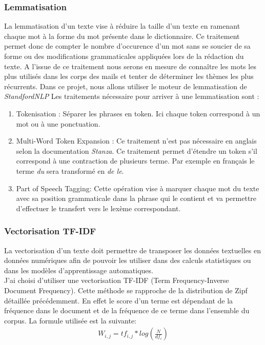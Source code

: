 \documentclass[a4paper,12pt]{article}
\begin{document}
		\subsubsection{Lemmatisation}
			La lemmatisation d'un texte vise à réduire la taille d'un texte en ramenant chaque mot à la forme du mot présente dans le dictionnaire. Ce traitement permet donc de compter le nombre d'occurence d'un mot sans se soucier de sa forme ou des modifications grammaticales appliquées lors de la rédaction du texte. A l'issue de ce traitement nous serons en mesure de connaître les mots les plus utilisés dans les corps des mails et tenter de déterminer les thèmes les plus récurrents.  
			Dans ce projet, nous allons utiliser le moteur de lemmatisation de \emph{StandfordNLP}\cite{manning-EtAl:2014:P14-5}\cite{qi2020stanza}
			Les traitements nécessaire pour arriver à une lemmatisation sont :
			\begin{enumerate}
				\item Tokenisation : Séparer les phrases en token. Ici chaque token correspond à un mot ou à une ponctuation.
				\item Multi-Word Token Expansion : Ce traitement n'est pas nécessaire en anglais selon la documentation \emph{Stanza}. Ce traitement permet d'étendre un token s'il correspond à une contraction de plusieurs terme. Par exemple en français le terme \emph{du} sera transformé en \emph{de le}.
				\item Part of Speech Tagging: Cette opération vise à marquer chaque mot du texte avec sa position grammaticale dans la phrase qui le contient et va permettre d'effectuer le transfert vers le lexème correspondant.
			\end{enumerate}
			
			
			
			
		
		\subsubsection{Vectorisation TF-IDF}
			La vectorisation d'un texte doit permettre de transposer les données textuelles en données numériques afin de pouvoir les utiliser dans des calculs statistiques ou dans les modèles d'apprentissage automatiques.\\
			J'ai choisi d'utiliser une vectorisation TF-IDF\cite{ml-python} (Term Frequency-Inverse Document Frequency). Cette méthode se rapproche de la distribution de Zipf détaillée précédemment. En effet le score d'un terme est dépendant de la fréquence dans le document et de la fréquence de ce terme dans l'ensemble du corpus. La formule utilisée est la suivante:
			\begin{align*}
				W_{i,j} = tf_{i,j}*log(\frac{N}{df_{i}})
			\end{align*}
		
\end{document}
